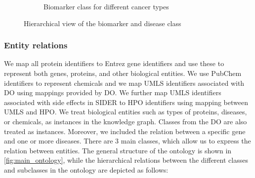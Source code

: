 \begin{figure}[h]
\begin{subfigure}{.48\linewidth}
		\caption{Biomarker class for different cancer types}
        \label{fig:annotations_for_genes}
	\end{subfigure}

	\caption{Hierarchical view of the biomarker and disease class} 
	\label{fig:property_enrich_annotations_for_genes}
	\vspace{-4mm}
\end{figure}

\subsubsection{Entity relations} 
We map all protein identifiers to Entrez gene identifiers and use these to represent both genes, proteins, and other biological entities. We use PubChem identifiers to represent chemicals and we map UMLS identifiers associated with DO using mappings provided by DO. We further map UMLS identifiers associated with side effects in SIDER to HPO identifiers using mapping between UMLS and HPO. We treat biological entities such as types of proteins, diseases, or chemicals, as instances in the knowledge graph. Classes from the DO are also treated as instances. Moreover, we included  the relation between a specific gene and one or more diseases. There are 3 main classes, which allow us to express the relation between entities. The general structure of the ontology is shown in \cref{fig:main_ontology}, while the hierarchical relations between the different classes and subclasses in the ontology are depicted as follows: \\

